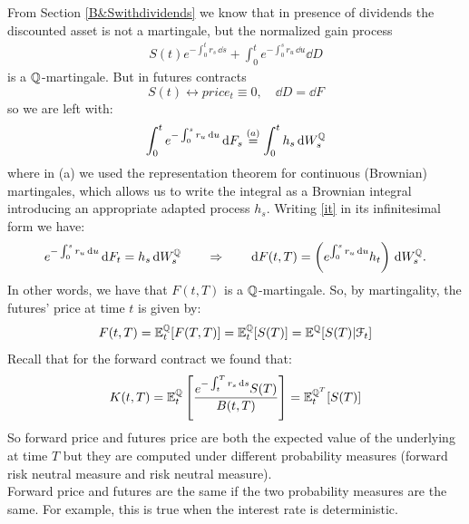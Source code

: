 From Section \ref{B&Swithdividends} we know that in presence of dividends the discounted asset is not a martingale, but the normalized gain process
\begin{align}
    S(t)e^{-\int_0^t r_s\,\dd s} + \int_0^t e^{-\int_0^s r_u\,\dd u}\dd D
\end{align}
is a $\mathbb{Q}$-martingale. But in futures contracts
\begin{equation*}
    S(t) \leftrightarrow price_t \equiv 0, \quad \dd D = \dd F
\end{equation*}
so we are left with:
\begin{align}\label{it}
    \int_0^t e^{-\int_0^s r_u\,\dd u}\,\dd F_s \overset{(a)}{=} \int_0^t h_s\,\dd W_s^{\mathbb{Q}}
\end{align}
where in (a) we used the representation theorem for continuous (Brownian) martingales, which allows us to write the integral as a Brownian integral introducing an appropriate adapted process $h_s$. Writing \eqref{it} in its infinitesimal form we have:
\begin{equation}
    e^{-\int_0^s r_u\,\dd u}\,\dd F_t = h_s\,\dd W_s^{\mathbb{Q}} \qquad\Rightarrow\qquad \dd F(t,T) = \left(e^{\int_0^s r_u\,\dd u}h_t\right)\,\dd W_s^{\mathbb{Q}}.
\end{equation}
In other words, we have that $F(t,T)$ is a $\mathbb{Q}$-martingale. So, by martingality, the futures' price at time $t$ is given by:
\begin{equation}
    F(t,T) = \mathbb{E}^{\mathbb{Q}}_t[F(T,T)] = \mathbb{E}^{\mathbb{Q}}_t[S(T)] = \mathbb{E}^{\mathbb{Q}}[S(T)|\mathcal{F}_t]
\end{equation}
Recall that for the forward contract we found that:
\begin{equation}
    K(t,T) = \mathbb{E}^{\mathbb{Q}}_t\left[\dfrac{e^{-\int_t^T r_s\,\dd s}S(T)}{B(t,T)}\right] = \mathbb{E}^{\mathbb{Q}^T}_t[S(T)]
\end{equation}
So forward price and futures price are both the expected value of the underlying at time $T$ but they are computed under different probability measures (forward risk neutral measure and risk neutral measure). \\
Forward price and futures are the same if the two probability measures are the same. For example, this is true when the interest rate is deterministic.

